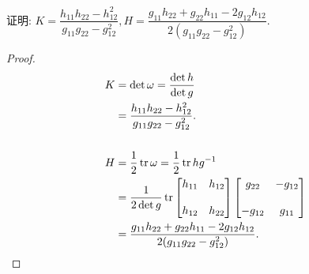 	\begin{excise}
		证明: $K=\dfrac{h_{11}h_{22}-h_{12}^{2}}{g_{11}g_{22}-g_{12}^{2}},H=\dfrac{g_{11}h_{22}+g_{22}h_{11}-2g_{12}h_{12}}{2(g_{11}g_{22}-g_{12}^{2})}$.
	\end{excise}
	\begin{proof}
		\begin{align*}
			K&=\det\omega=\frac{\det h}{\det g}\\
			&=\frac{h_{11}h_{22}-h_{12}^{2}}{g_{11}g_{22}-g_{12}^{2}}.\\ \\
			H&=\frac{1}{2}\operatorname{tr}\omega=\frac{1}{2}\operatorname{tr} hg^{-1}\\
			&=\frac{1}{2\det g}\operatorname{tr}
			\begin{bmatrix}
				h_{11}&h_{12}\\ \\
				h_{12}&h_{22}
			\end{bmatrix}
			\begin{bmatrix}
				g_{22}&-g_{12}\\ \\
				-g_{12}&g_{11}
			\end{bmatrix}\\
			&=\frac{g_{11}h_{22}+g_{22}h_{11}-2g_{12}h_{12}}{2(g_{11}g_{22}-g_{12}^{2})}.
		\end{align*}
	\end{proof}

